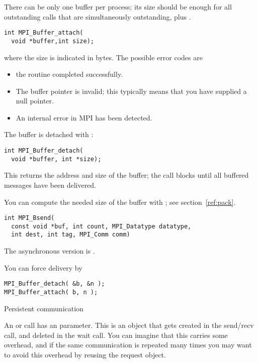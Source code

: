 There can be only one buffer per process; its size should be enough
for all outstanding  calls that are simultaneously
outstanding, plus .

\begin{verbatim}
int MPI_Buffer_attach(
  void *buffer,int size);
\end{verbatim}
where the size is indicated in bytes.
The possible error codes are
\begin{itemize}
\item {} the routine completed successfully.
\item {} The buffer pointer is invalid;
  this typically means that you have supplied a null pointer.
\item {} An internal error in MPI has been detected.
\end{itemize}

The buffer is detached with :
\begin{verbatim}
int MPI_Buffer_detach(
  void *buffer, int *size);
\end{verbatim}
This returns the address and size of the buffer; the call blocks
until all buffered messages have been delivered.

You can compute the needed size of the buffer with ;
  see section~\ref{ref:pack}.

\begin{verbatim}
int MPI_Bsend(
  const void *buf, int count, MPI_Datatype datatype, 
  int dest, int tag, MPI_Comm comm)
\end{verbatim}
The asynchronous version is .

You can force delivery by
\begin{verbatim}
MPI_Buffer_detach( &b, &n );
MPI_Buffer_attach( b, n );
\end{verbatim}

 {Persistent communication}
\label{sec:persistent}

An  or  call has an  parameter. This
is an object that gets created in the send/recv call, and deleted in
the wait call. You can imagine that this carries some overhead, and if
the same communication is repeated many times you may want to avoid
this overhead by reusing the request object.

